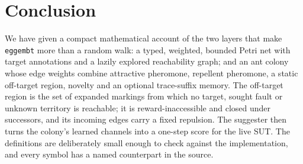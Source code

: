 \documentclass[11pt,a4paper]{article}
\begin{document}
\section{Conclusion}

We have given a compact mathematical account of the two layers that make
\texttt{eggembt} more than a random walk: a typed, weighted, bounded Petri net
with target annotations and a lazily explored reachability graph; and an ant
colony whose edge weights combine attractive pheromone, repellent pheromone, a
static off-target region, novelty and an optional trace-suffix memory.  The
off-target region is the set of expanded markings from which no target,
sought fault or unknown territory is reachable; it is reward-inaccessible and
closed under successors, and its incoming edges carry a fixed repulsion.  The suggester then turns the colony's
learned channels into a one-step score for the live SUT.  The definitions are
deliberately small enough to check against the implementation, and every
symbol has a named counterpart in the source.



\end{document}
